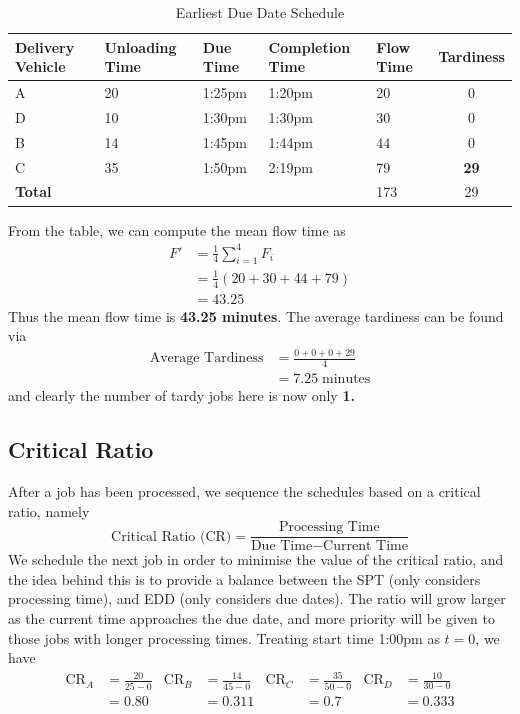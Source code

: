 \documentclass[12pt]{article}
\begin{document}
\begin{table}[H]
    \centering
    \begin{tabular}{p{1.8cm} p{3cm} p{1.8cm} p{3cm} p{1.8cm} c} \toprule
        \textbf{Delivery Vehicle} & \textbf{Unloading Time} & \textbf{Due Time} & \textbf{Completion Time} & \textbf{Flow Time} & \textbf{Tardiness} \\ \midrule 
        A & 20 & 1:25pm & 1:20pm & 20 & 0 \\ 
        D & 10 & 1:30pm & 1:30pm & 30 & 0 \\ 
        B & 14 & 1:45pm & 1:44pm & 44 & 0 \\ 
        C & 35 & 1:50pm & 2:19pm & 79 & \textbf{29} \\ \midrule
        \textbf{Total} & & & & 173 & 29 \\ \bottomrule
    \end{tabular}
    \caption{Earliest Due Date Schedule}
    \label{tab:4-EDD}
\end{table}

\noindent From the table, we can compute the mean flow time as \begin{align*}
    F' &= \frac{1}{4} \sum_{i=1}^{4} F_i \\ 
    &= \frac{1}{4} \left( 20 + 30 + 44 + 79 \right) \\ 
    &= 43.25
\end{align*} Thus the mean flow time is \textbf{43.25 minutes}. The average tardiness can be found via \begin{align*}
    \text{Average Tardiness} &= \frac{0 + 0 + 0 + 29}{4} \\ 
    &= 7.25 \; \text{minutes}
\end{align*} and clearly the number of tardy jobs here is now only \textbf{1.} 

\subsection*{Critical Ratio}

After a job has been processed, we sequence the schedules based on a critical ratio, namely \begin{equation}
    \text{Critical Ratio (CR)} = \frac{\text{Processing Time}}{\text{Due Time} - \text{Current Time}}
\end{equation} We schedule the next job in order to minimise the value of the critical ratio, and the idea behind this is to provide a balance between the SPT (only considers processing time), and EDD (only considers due dates). The ratio will grow larger as the current time approaches the due date, and more priority will be given to those jobs with longer processing times. Treating start time 1:00pm as $t = 0$, we have \begin{align*}
     \text{CR}_A &= \frac{20}{25 - 0} & \text{CR}_B &= \frac{14}{45 - 0} & \text{CR}_C &= \frac{35}{50 - 0} & \text{CR}_D &= \frac{10}{30 - 0} \\ 
     &= 0.80  & &= 0.311 & &= 0.7 & &= 0.333
\end{align*}
\end{document}
